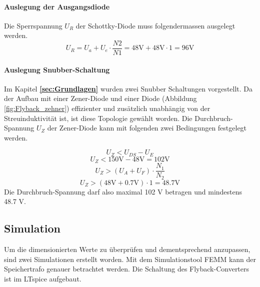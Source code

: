 \paragraph{Auslegung der Ausgangsdiode}
Die Sperrspannung $ U_{R} $ der Schottky-Diode muss folgendermassen ausgelegt werden.\cite{speerwandler}
\begin{equation}\label{eq:sperrspannung_diode}
U_{R} = U_{a} + U_{e} \cdot \frac{N2}{N1} = 48\mathrm{V} + 48\mathrm{V} \cdot 1 = 96\mathrm{V}
\end{equation}

\paragraph{Auslegung  Snubber-Schaltung}
Im Kapitel \textbf{\ref{sec:Grundlagen} } wurden zwei Snubber Schaltungen vorgestellt. Da der Aufbau mit einer Zener-Diode und einer Diode (Abbildung \ref{fig:Flyback_zehner}) effizienter und zusätzlich unabhängig von der Streuinduktivität ist, ist diese Topologie gewählt worden. Die Durchbruch-Spannung $ U_{Z} $ der Zener-Diode kann mit folgenden zwei Bedingungen festgelegt werden. \cite{bachelor}  

\begin{equation}\label{eq:sperrspannung_zener1}
U_{Z} < U_{DS} - U_{E}
\end{equation}
\begin{equation}\label{eq:sperrspannung_zener1_berechnet}
U_{Z} <  150\mathrm{V} - 48\mathrm{V}  = 102\mathrm{V}
\end{equation}
\begin{equation}\label{eq:sperrspannung_zehner2}
U_{Z} > (U_{A} + U_{F}) \cdot \frac{N_{1}}{N_{2}}
\end{equation}
\begin{equation}\label{eq:sperrspannung_zehner2_berechnet}
U_{Z} >(48\mathrm{V} + 0.7\mathrm{V}) \cdot 1 = 48.7\mathrm{V}
\end{equation}
Die Durchbruch-Spannung darf also maximal 102 V betragen und mindestens 48.7 V.

\subsection{Simulation}\label{sec:simulation}
Um die dimensionierten Werte zu überprüfen und dementsprechend anzupassen, sind zwei Simulationen erstellt worden. Mit dem Simulationstool FEMM kann der Speichertrafo genauer betrachtet werden. Die Schaltung des Flyback-Converters ist im LTspice aufgebaut.

